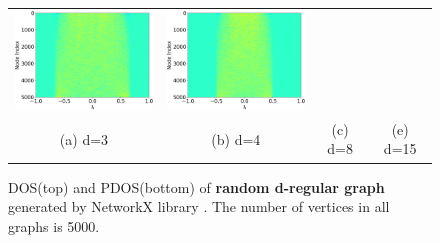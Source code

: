 \documentclass[senior,final,11pt]{iscs-thesis}
\begin{document}
\begin{figure}[htbp]
\begin{tabular}{cccc}
    \includegraphics[width=45mm]{figure/random_regular_graph_d8_n5000txt_pdos.png} &
    \includegraphics[width=45mm]{figure/random_regular_graph_d15_n5000txt_pdos.png} \\
    (a) d=3 & (b) d=4& (c) d=8 & (e) d=15\\ [6pt]
  \end{tabular}
  \caption{DOS(top) and PDOS(bottom) of {\bf random d-regular graph} generated by NetworkX library \cite{SciPyProceedings_11}. The number of vertices in all graphs is 5000. }
  \label{fig:random_regular}
\end{figure}
\end{document}
